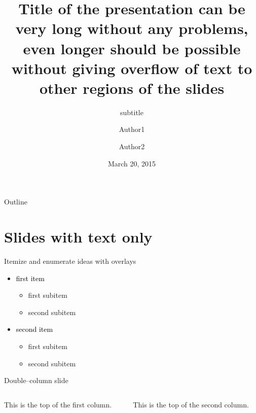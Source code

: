 \documentclass[11pt,t]{beamer}
\title{Title of the presentation can be very long without any problems, even longer should be possible without giving overflow of text to other regions of the slides}
\subtitle{subtitle}
\author{Author1\inst{1} \and Author2\inst{2}}
\institute{
	\inst{1}Institute 1
	\and
	\inst{2}Institute 2
}
\date{March 20, 2015}
\begin{document}
	{
	\begin{frame}
		\titlepage
	\end{frame}
	}
\begin{frame}{Outline}
	\vskip 5mm
	\hfill	{\large \parbox{.95\textwidth}{\tableofcontents[hideallsubsections]}}
\end{frame}

\section{Slides with text only}
\begin{frame}{Itemize and enumerate ideas with overlays}
	\begin{itemize}
		\item \textcolor{black}{first item}
			\begin{itemize}
				\item first subitem
				\item second subitem
			\end{itemize}
		\item \textcolor{black}{second item}
			\begin{itemize}
				\item first subitem
				\item second subitem
			\end{itemize}
	\end{itemize}
\end{frame}
\begin{frame}[t]{Double--column slide}
	\begin{columns}[t]
		\begin{column}{.5\textwidth}
			This is the top of the first column.	
		\end{column}
		\begin{column}{.5\textwidth}
			This is the top of the second column.
		\end{column}
	\end{columns}	
\end{frame}
\end{document}
